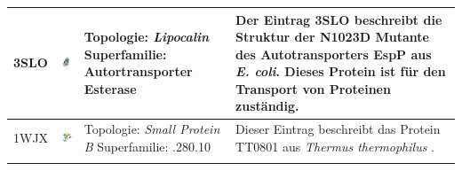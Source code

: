 \documentclass{report}
\begin{document}
\begin{table}
\begin{center}
\begin{tabular}{ | C{9mm} | C{30mm} | C{29mm} | C{38mm} | }
3SLO  & \includegraphics[width=30mm, trim= -10 -5 -5 -10]{3SLO_bio_r_500.jpg}  & Topologie: \newline \textit{Lipocalin} \newline Superfamilie: \newline Autortransporter Esterase   & Der Eintrag 3SLO beschreibt die Struktur der N1023D Mutante des Autotransporters EspP \cite{3slo} aus \textit{E. coli}. Dieses Protein ist f\"ur den Transport von Proteinen zust\"andig. \\ \hline
1WJX  & \includegraphics[width=30mm, trim= -10 -5 -5 -10]{1WJX_bio_r_500.jpg} & Topologie: \newline \textit{Small Protein B} \newline Superfamilie: .280.10 & Dieser Eintrag beschreibt das Protein TT0801 aus \textit{Thermus thermophilus} \cite{1wjx}. \\ 
\hline

\label{tab:occ_beta}
\end{tabular}
\end{center}
\end{table}
\end{document}
